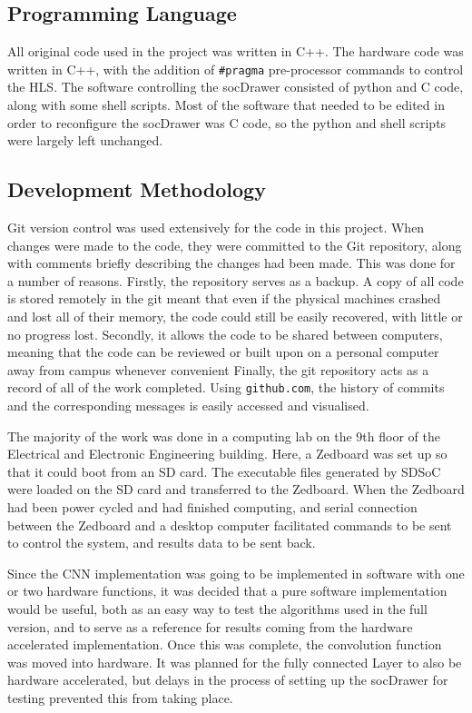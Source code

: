 \documentclass[12pt]{article}
\begin{document}
\subsection{Programming Language}
\label{sec:Imp-Language}

All original code used in the project was written in C++. The hardware code was written in C++, with the addition of \lstinline|#pragma| pre-processor commands to control the HLS. The software controlling the socDrawer consisted of python and C code, along with some shell scripts. Most of the software that needed to be edited in order to reconfigure the socDrawer was C code, so the python and shell scripts were largely left unchanged.

\subsection{Development Methodology}
\label{sec:Imp-Devlopment}

Git version control was used extensively for the code in this project. When changes were made to the code, they were committed to the Git repository, along with comments briefly describing the changes had been made. This was done for a number of reasons. Firstly, the repository serves as a backup. A copy of all code is stored remotely in the git meant that even if the physical machines crashed and lost all of their memory, the code could still be easily recovered, with little or no progress lost. Secondly, it allows the code to be shared between computers, meaning that the code can be reviewed or built upon on a personal computer away from campus whenever convenient Finally, the git repository acts as a record of all of the work completed. Using \lstinline|github.com|, the history of commits and the corresponding messages is easily accessed and visualised. 

The majority of the work was done in a computing lab on the 9th floor of the Electrical and Electronic Engineering building. Here, a Zedboard was set up so that it could boot from an SD card. The executable files generated by SDSoC were loaded on the SD card and transferred to the Zedboard. When the Zedboard had been power cycled and had finished computing, and serial connection between the Zedboard and a desktop computer facilitated commands to be sent to control the system, and results data to be sent back.

Since the CNN implementation was going to be implemented in software with one or two hardware functions, it was decided that a pure software implementation would be useful, both as an easy way to test the algorithms used in the full version, and to serve as a reference for results coming from the hardware accelerated implementation. Once this was complete, the convolution function was moved into hardware. It was planned for the fully connected Layer to also be hardware accelerated, but delays in the process of setting up the socDrawer for testing prevented this from taking place.
\end{document}
